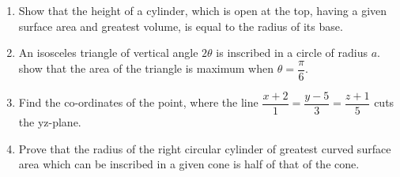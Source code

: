 \begin{enumerate}

\item  Show that the height of a cylinder, which is open at the top, having a given surface area and greatest volume, is equal to the radius of its base.
 



\item An isosceles triangle of vertical angle $2\theta$ is inscribed in a circle of radius $a$. show that the area of the triangle is maximum when $\theta=\dfrac{\pi}{6}$.

\item Find the co-ordinates of the point, where the line $\dfrac{x+2}{1}=\dfrac{y-5}{3}=\dfrac{z+1}{5}$ cuts the yz-plane.

\item Prove that the radius of the right circular cylinder of greatest curved surface area which can be inscribed in a given cone is half of that of the cone.
 
\end{enumerate}
